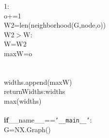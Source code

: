 {{\begin{tabbing}
\hspace{6pt}1:\\
\hspace{72pt}o\hspace{6pt}+=\hspace{6pt}1\\
\hspace{72pt}W2\hspace{6pt}=\hspace{6pt}len(neighborhood(G,node,o))\\
\hspace{6pt}W2\hspace{6pt}$>$\hspace{6pt}W:\\
\hspace{96pt}W\hspace{6pt}=\hspace{6pt}W2\\
\hspace{96pt}maxW\hspace{6pt}=\hspace{6pt}o\\
\\
\\
\hspace{48pt}widths.append(maxW)\\
\hspace{6pt}returnWidths:\hspace{6pt}widths\\
\hspace{6pt}max(widths)\\
\\
{\textbf{if}}\hspace{6pt}\_\_name\_\_=={\texttt{{'}\_\_main\_\_{'}}}:\\
\hspace{24pt}G\hspace{6pt}=\hspace{6pt}NX.Graph()\\
\\

\end{tabbing}}}
